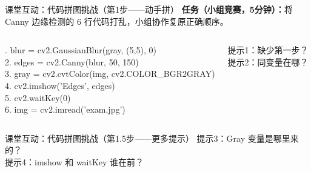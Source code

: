 \begin{frame}{课堂互动：代码拼图挑战（第1步——动手拼）}
    \textbf{任务（小组竞赛，5分钟）：}将 Canny 边缘检测的 6 行代码打乱，小组协作复原正确顺序。

    \begin{columns}[t]
        \fontsize{9pt}{10pt}. blur = cv2.GaussianBlur(gray, (5,5), 0)\\
        2. edges = cv2.Canny(blur, 50, 150)\\
        3. gray = cv2.cvtColor(img, cv2.COLOR\_BGR2GRAY)\\
        4. cv2.imshow('Edges', edges)\\
        5. cv2.waitKey(0)\\
        6. img = cv2.imread('exam.jpg')

        \fontsize{9pt}{10pt}\selectfont
        提示1：缺少第一步？\\[4pt]
        提示2：同变量在哪？
    \end{columns}
\end{frame}

\begin{frame}{课堂互动：代码拼图挑战（第1.5步——更多提示）}
    \fontsize{9pt}{10pt}\selectfont
    提示3：Gray 变量是哪里来的？\\[4pt]
    提示4：imshow 和 waitKey 谁在前？\\[6pt]

\end{frame}

